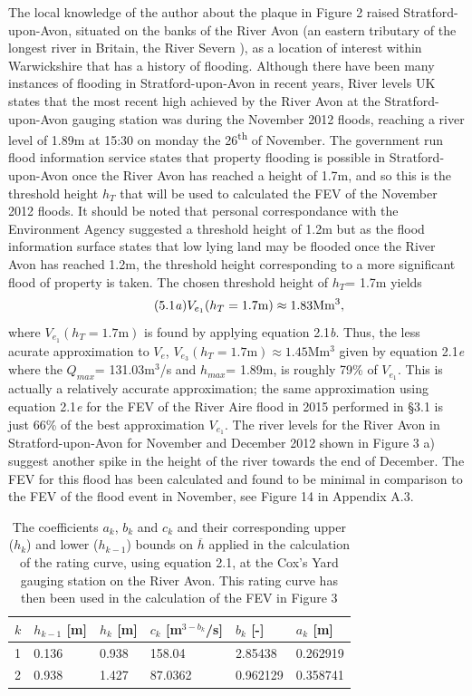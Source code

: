 \documentclass[11pt,a4paper]{article}
\begin{document}
The local knowledge of the author about the plaque in Figure 2 raised Stratford-upon-Avon, situated on the banks of the River Avon (an eastern tributary of the longest river in Britain, the River Severn \cite{britannica}), as a location of interest within Warwickshire that has a history of flooding. Although there have been many instances of flooding in Stratford-upon-Avon in recent years, River levels UK \cite{recent-high} states that the most recent high achieved by the River Avon at the Stratford-upon-Avon gauging station was during the November 2012 floods, reaching a river level of 1.89m at 15:30 on monday the 26\textsuperscript{th} of November. The government run flood information service \cite{ht} states that property flooding is possible in Stratford-upon-Avon once the River Avon has reached a height of 1.7m, and so this is the threshold height $h_T$ that will be used to calculated the FEV of the November 2012 floods. It should be noted that personal correspondance with the Environment Agency \cite{EA} suggested a threshold height of 1.2m but as the flood information surface states that low lying land may be flooded once the River Avon has reached 1.2m, the threshold height corresponding to a more significant flood of property is taken. The chosen threshold height of $h_T$= 1.7m yields
\begin{equation}\tag{5.1\textit{a}}
V_{e_1}(h_T=\text{1.7m})\approx 1.83\text{Mm$^3$},
\end{equation}
where $V_{e_1}(h_T=\text{1.7m})$ is found by applying equation 2.1\textit{b}. Thus, the less acurate approximation to $V_e$, $V_{e_3}(h_T=\text{1.7m})\approx 1.45\text{Mm$^3$}$ given by equation 2.1\textit{e} where the $Q_{max}$= 131.03m$^3$/s and $h_{max}$= 1.89m, is roughly 79\% of $V_{e_1}$. This is actually a relatively accurate approximation{;} the same approximation using equation 2.1\textit{e} for the FEV of the River Aire flood in 2015 performed in \S 3.1 is just 66\% of the best approximation $V_{e_1}$. The river levels for the River Avon in Stratford-upon-Avon for November and December 2012 shown in Figure 3 a) suggest another spike in the height of the river towards the end of December. The FEV for this flood has been calculated and found to be minimal in comparison to the FEV of the flood event in November, see Figure 14 in Appendix A.3. 

\begin{table}[ht!]
\begin{tabular}{l|l|l|l|l|l}
$k$ & $h_{k-1}$ [m] & $h_k$ [m] & $c_k$ [m$^{3-b_k}$/s] & $b_k$ [-] & $a_k$ [m]\\
\hline
1 & 0.136 & 0.938 & 158.04 & 2.85438 & 0.262919 \\
2 & 0.938 & 1.427 & 87.0362 & 0.962129 & 0.358741 \\
\end{tabular}
\caption{The coefficients $a_k$, $b_k$ and $c_k$ and their corresponding upper ($h_k$) and lower ($h_{k-1}$) bounds on $\overline{h}$ \cite{EA} applied in the calculation of the rating curve, using equation 2.1, at the Cox's Yard gauging station on the River Avon. This rating curve has then been used in the calculation of the FEV in Figure 3}
\end{table}
\end{document}
